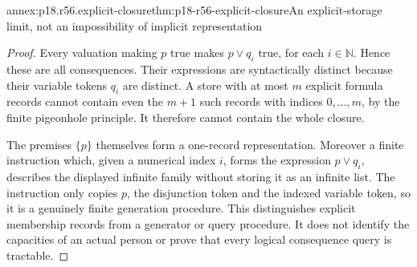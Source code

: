 \begin{annexitem}{annex:p18.r56.explicit-closure}{thm:p18-r56-explicit-closure}{An explicit-storage limit, not an impossibility of implicit representation}
\begin{proof}
Every valuation making \(p\) true makes \(p\lor q_i\) true,
for each \(i\in\mathbb N\). Hence these are all consequences.
Their expressions are syntactically distinct because their variable
tokens \(q_i\) are distinct. A store with at most \(m\) explicit
formula records cannot contain even the \(m+1\) such records with
indices \(0,\ldots,m\), by the finite pigeonhole principle.
It therefore cannot contain the whole closure.

The premises \(\{p\}\) themselves form a one-record representation.
Moreover a finite instruction which, given a numerical index \(i\),
forms the expression \(p\lor q_i\), describes the displayed
infinite family without storing it as an infinite list. The instruction
only copies \(p\), the disjunction token and the indexed variable
token, so it is a genuinely finite generation procedure. This
distinguishes explicit membership records from a generator or
query procedure. It does not identify the capacities of an actual
person or prove that every logical consequence query is tractable.
\end{proof}
\end{annexitem}

